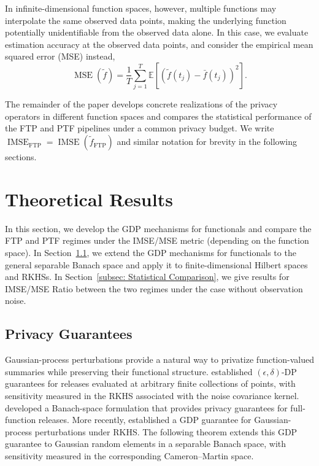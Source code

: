 \documentclass[twoside,11pt]{article}
\begin{document}
In infinite-dimensional function spaces, however, multiple functions may interpolate the same observed data points, making the underlying function potentially unidentifiable from the observed data alone. In this case, we evaluate estimation accuracy at the observed data points, and consider the empirical mean squared error (MSE) instead,
\begin{equation}
\operatorname{MSE}(\widetilde{f})
=
\frac1T
\sum_{j=1}^T
\mathbb E
\left[
(\widetilde f(t_j)-\bar f(t_j))^2
\right].
\label{eq: Empirical MSE}
\end{equation}

The remainder of the paper develops concrete realizations of the privacy operators in different function spaces and compares the statistical performance of the FTP and PTF pipelines under a common privacy budget. We write $\operatorname{IMSE}_{\mathrm{FTP}} = \operatorname{IMSE} (\widetilde{f}_{\mathrm{FTP}})$ and similar notation for brevity in the following sections.

\section{Theoretical Results}  \label{sec: Theoretical Results}
In this section, we develop the GDP mechanisms for functionals and compare the FTP and PTF regimes under the IMSE/MSE metric (depending on the function space). In Section~\ref{sec: GDP for functionals}, we extend the GDP mechanisms for functionals to the general separable Banach space and apply it to finite-dimensional Hilbert spaces and RKHSs. In Section~\ref{subsec: Statistical Comparison}, we give results for IMSE/MSE Ratio between the two regimes under the case without observation noise.
\subsection{Privacy Guarantees}
\label{sec: GDP for functionals}
Gaussian-process perturbations provide a natural way to privatize
function-valued summaries while preserving their functional structure.
\citet{hall2013differential} established $(\epsilon,\delta)$-DP guarantees
for releases evaluated at arbitrary finite collections of points, with
sensitivity measured in the RKHS associated with the noise covariance
kernel. \citet{mirshani2019formal} developed a Banach-space formulation
that provides privacy guarantees for full-function releases.
More recently, \citet{raisa2024noise} established a GDP guarantee for
Gaussian-process perturbations under RKHS.
The following theorem extends this GDP guarantee to Gaussian random
elements in a separable Banach space, with sensitivity measured in
the corresponding Cameron--Martin space.
\end{document}
